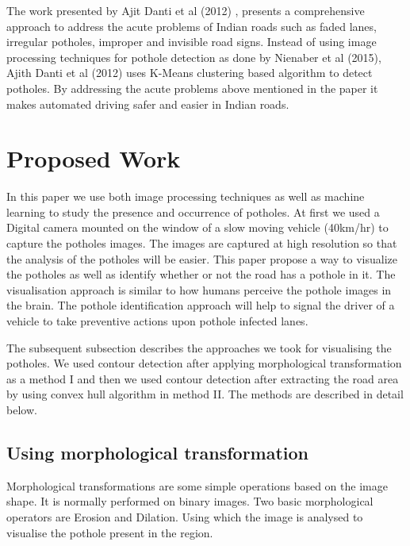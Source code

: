\documentclass[journal]{IEEEtran}
\begin{document}
\vspace*{.5cm}

The work presented by Ajit Danti et al (2012) \cite{papertwo}, presents a comprehensive approach to address the acute problems of Indian roads such as faded lanes, irregular potholes, improper and invisible road signs. Instead of using image processing techniques for pothole detection as done by Nienaber et al (2015), Ajith Danti et al (2012) uses K-Means clustering based algorithm to detect potholes. By addressing the acute problems above mentioned in the paper it makes automated driving safer and easier in Indian roads. 

\section{Proposed Work}
In this paper we use both image processing techniques as well as machine learning to study the presence and occurrence of potholes. At first we used a Digital camera mounted on the window of a slow moving vehicle (40km/hr) to capture the potholes images. The images are captured at high resolution so that the analysis of the potholes will be easier. This paper propose a way to visualize the potholes as well as identify whether or not the road has a pothole in it. The visualisation approach is similar to how humans perceive the pothole images in the brain. The pothole identification approach will help to signal the driver of a vehicle to take preventive actions upon pothole infected lanes. 

\vspace{0.5cm}

The subsequent subsection describes the approaches we took for visualising the potholes. We used contour detection after applying morphological transformation as a method I and then we used contour detection after extracting the road area by using convex hull algorithm in method II. The methods are described in detail below.

\subsection{Using morphological transformation}

Morphological transformations are some simple operations based on the image shape. It is normally performed on binary images. Two basic morphological operators are Erosion and Dilation. Using which the image is analysed to visualise the pothole present in the region.
\end{document}
